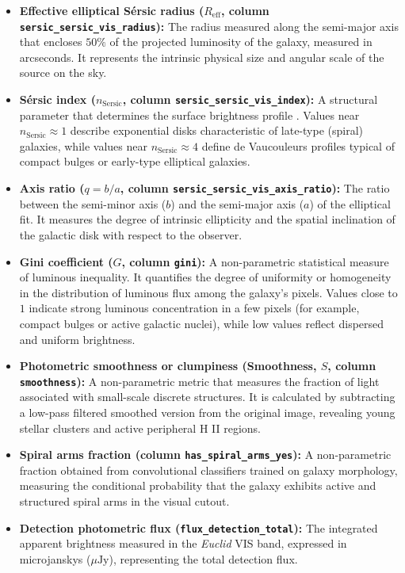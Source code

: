 \begin{itemize}
	\item \textbf{Effective elliptical Sérsic radius ($R_{\text{eff}}$, column \texttt{sersic\_sersic\_vis\_radius}):} The radius measured along the semi-major axis that encloses $50\%$ of the projected luminosity of the galaxy, measured in arcseconds. It represents the intrinsic physical size and angular scale of the source on the sky.
	\item \textbf{Sérsic index ($n_{\text{Sersic}}$, column \texttt{sersic\_sersic\_vis\_index}):} A structural parameter that determines the surface brightness profile \autocite{ar:sersic-1968}. Values near $n_{\text{Sersic}} \approx 1$ describe exponential disks characteristic of late-type (spiral) galaxies, while values near $n_{\text{Sersic}} \approx 4$ define de Vaucouleurs profiles \autocite{ar:vaucouleurs-1959} typical of compact bulges or early-type elliptical galaxies.
	\item \textbf{Axis ratio ($q = b/a$, column \texttt{sersic\_sersic\_vis\_axis\_ratio}):} The ratio between the semi-minor axis ($b$) and the semi-major axis ($a$) of the elliptical fit. It measures the degree of intrinsic ellipticity and the spatial inclination of the galactic disk with respect to the observer.
	\item \textbf{Gini coefficient ($G$, column \texttt{gini}):} A non-parametric statistical measure of luminous inequality. It quantifies the degree of uniformity or homogeneity in the distribution of luminous flux among the galaxy's pixels. Values close to $1$ indicate strong luminous concentration in a few pixels (for example, compact bulges or active galactic nuclei), while low values reflect dispersed and uniform brightness.
	\item \textbf{Photometric smoothness or clumpiness (Smoothness, $S$, column \texttt{smoothness}):} A non-parametric metric that measures the fraction of light associated with small-scale discrete structures. It is calculated by subtracting a low-pass filtered smoothed version from the original image, revealing young stellar clusters and active peripheral H II regions.
	\item \textbf{Spiral arms fraction (column \texttt{has\_spiral\_arms\_yes}):} A non-parametric fraction obtained from convolutional classifiers trained on galaxy morphology, measuring the conditional probability that the galaxy exhibits active and structured spiral arms in the visual cutout.
	\item \textbf{Detection photometric flux (\texttt{flux\_detection\_total}):} The integrated apparent brightness measured in the \textit{Euclid} VIS band, expressed in microjanskys ($\mu\text{Jy}$), representing the total detection flux.
\end{itemize}

